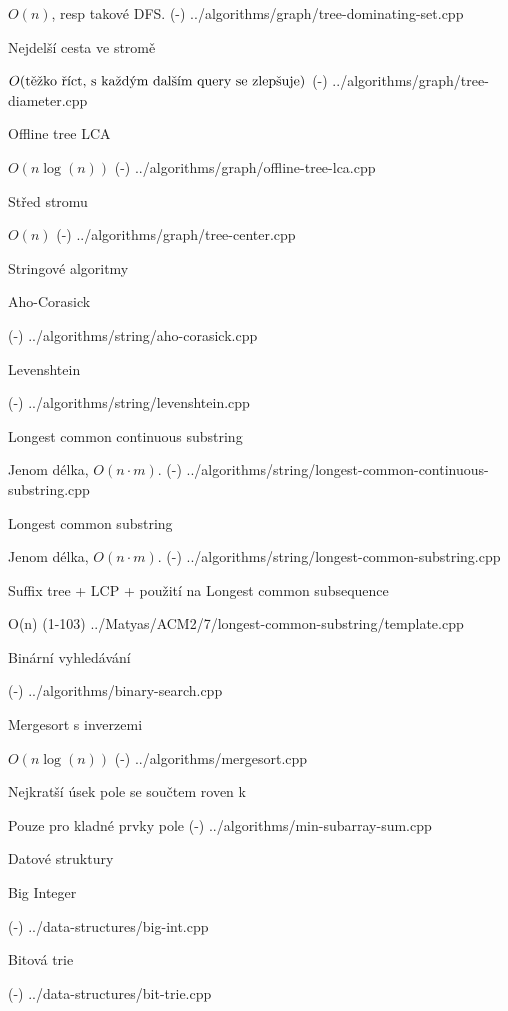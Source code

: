 $O(n)$, resp takové DFS.
\verbinput (-) ../algorithms/graph/tree-dominating-set.cpp

\secc Nejdelší cesta ve stromě 

$O(\hbox{těžko říct, s každým dalším query se zlepšuje})$
\verbinput (-) ../algorithms/graph/tree-diameter.cpp

\secc Offline tree LCA 

$O(n\log(n))$
\verbinput (-) ../algorithms/graph/offline-tree-lca.cpp

\secc Střed stromu 

$O(n)$
\verbinput (-) ../algorithms/graph/tree-center.cpp

\sec Stringové algoritmy

\secc Aho-Corasick

\verbinput (-) ../algorithms/string/aho-corasick.cpp

\secc Levenshtein 

\verbinput (-) ../algorithms/string/levenshtein.cpp

\secc Longest common continuous substring 

Jenom délka, $O(n \cdot m)$.
\verbinput (-) ../algorithms/string/longest-common-continuous-substring.cpp

\secc Longest common substring 

Jenom délka, $O(n \cdot m)$.
\verbinput (-) ../algorithms/string/longest-common-substring.cpp

\secc Suffix tree + LCP + použití na Longest common subsequence 

O(n)
\verbinput (1-103) ../Matyas/ACM2/7/longest-common-substring/template.cpp

\sec Binární vyhledávání 

\verbinput (-) ../algorithms/binary-search.cpp

\sec Mergesort s inverzemi 

$O(n\log(n))$
\verbinput (-) ../algorithms/mergesort.cpp

\sec Nejkratší úsek pole se součtem roven k 

Pouze pro kladné prvky pole
\verbinput (-) ../algorithms/min-subarray-sum.cpp

\newpage

\chap Datové struktury

\sec Big Integer 

\verbinput (-) ../data-structures/big-int.cpp

\sec Bitová trie 

\verbinput (-) ../data-structures/bit-trie.cpp

